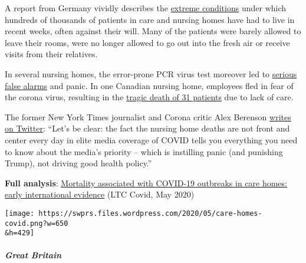 A report from Germany vividly describes the
\href{https://www.rnd.de/gesundheit/corona-ist-mir-egal-warum-helga-witt-kronshage-86-lieber-sterben-will-als-eingesperrt-zu-sein-3MEBDIOBEFA6BDULC4N5WGZJG4.html}{extreme
conditions} under which hundreds of thousands of patients in care and
nursing homes have had to live in recent weeks, often against their
will. Many of the patients were barely allowed to leave their rooms,
were no longer allowed to go out into the fresh air or receive visits
from their relatives.

In several nursing homes, the error-prone PCR virus test moreover led to
\href{https://www.wjhl.com/local-coronavirus-coverage/agape-nursing-home-says-residents-who-tested-positive-for-covid-19-were-false-positives/}{serious
false alarms} and panic. In one Canadian nursing home, employees fled in
fear of the corona virus, resulting in the
\href{https://www.nytimes.com/2020/04/16/world/canada/montreal-nursing-homes-coronavirus.html}{tragic
death of 31 patients} due to lack of care.

The former New York Times journalist and Corona critic Alex Berenson
\href{https://twitter.com/AlexBerenson/status/1257496834043531267}{writes
on Twitter}: ``Let's be clear: the fact the nursing home deaths are not
front and center every day in elite media coverage of COVID tells you
everything you need to know about the media's priority -- which is
instilling panic (and punishing Trump), not driving good health
policy.''

\textbf{Full analysis}:
\href{https://ltccovid.org/2020/04/12/mortality-associated-with-covid-19-outbreaks-in-care-homes-early-international-evidence/}{Mortality
associated with COVID-19 outbreaks in care homes: early international
evidence} (LTC Covid, May 2020)

\texttt{[image: https://swprs.files.wordpress.com/2020/05/care-homes-covid.png?w=650\\\&h=429]}

\hypertarget{great-britain}{%
\subparagraph{\texorpdfstring{\textbf{Great
Britain}}{Great Britain}}\label{great-britain}}

